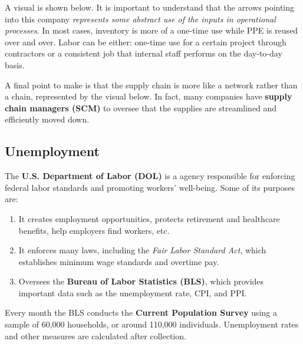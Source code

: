 \documentclass{article}
\begin{document}
    A visual is shown below. It is important to understand that the arrows pointing into this company \textit{represents some abstract use of the inputs in operational processes}. In most cases, inventory is more of a one-time use while PPE is reused over and over. Labor can be either: one-time use for a certain project through contractors or a consistent job that internal staff performs on the day-to-day basis.

    \begin{center}
    \end{center}

    A final point to make is that the supply chain is more like a network rather than a chain, represented by the visual below. In fact, many companies have \textbf{supply chain managers (SCM)} to oversee that the supplies are streamlined and efficiently moved down.

    \begin{center}
    \end{center}

  \subsection{Unemployment}

    \begin{definition}
      \label{def:u-s-department-of-labor}
      The \textbf{U.S. Department of Labor (DOL)} is a agency responsible for enforcing federal labor standards and promoting workers' well-being. Some of its purposes are: 
      \begin{enumerate}
          \item It creates employment opportunities, protects retirement and healthcare benefits, help employers find workers, etc. 
          \item It enforces many laws, including the \textit{Fair Labor Standard Act}, which establishes minimum wage standards and overtime pay. 
          \item Oversees the \textbf{Bureau of Labor Statistics (BLS)}, which provides important data such as the unemployment rate, CPI, and PPI. 
      \end{enumerate}
      Every month the BLS conducts the \textbf{Current Population Survey} using a sample of 60,000 households, or around 110,000 individuals. Unemployment rates and other measures are calculated after collection. 
    \end{definition}
\end{document}
